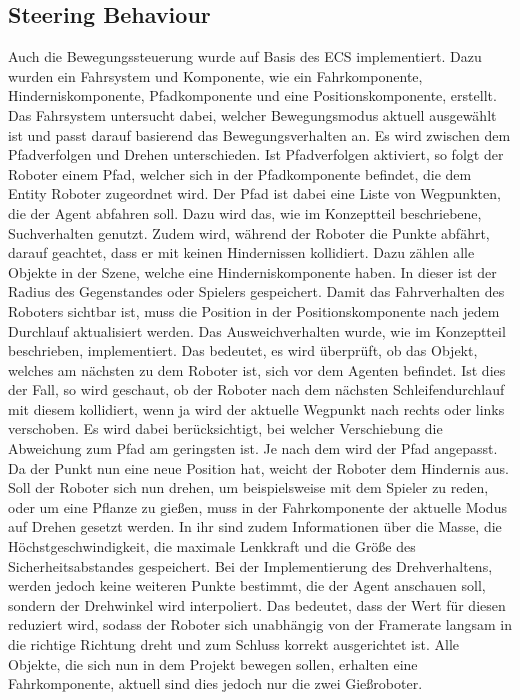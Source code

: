 \subsection{Steering Behaviour}
Auch die Bewegungssteuerung wurde auf Basis des ECS implementiert. Dazu wurden ein Fahrsystem und Komponente, wie ein Fahrkomponente, Hinderniskomponente, Pfadkomponente und eine Positionskomponente, erstellt. Das Fahrsystem untersucht dabei, welcher Bewegungsmodus aktuell ausgewählt ist und passt darauf basierend das Bewegungsverhalten an. Es wird zwischen dem Pfadverfolgen und Drehen unterschieden. Ist Pfadverfolgen aktiviert, so folgt der Roboter einem Pfad, welcher sich in der Pfadkomponente befindet, die dem Entity Roboter zugeordnet wird. Der Pfad ist dabei eine Liste von Wegpunkten, die der Agent abfahren soll. Dazu wird das, wie im Konzeptteil beschriebene, Suchverhalten genutzt. Zudem wird, während der Roboter die Punkte abfährt, darauf geachtet, dass er mit keinen Hindernissen kollidiert. Dazu zählen alle Objekte in der Szene, welche eine Hinderniskomponente haben. In dieser ist der Radius des Gegenstandes oder Spielers gespeichert. Damit das Fahrverhalten des Roboters sichtbar ist, muss die Position in der Positionskomponente nach jedem Durchlauf aktualisiert werden. Das Ausweichverhalten wurde, wie im Konzeptteil beschrieben, implementiert. Das bedeutet, es wird überprüft, ob das Objekt, welches am nächsten zu dem Roboter ist, sich vor dem Agenten befindet. Ist dies der Fall, so wird geschaut, ob der Roboter nach dem nächsten Schleifendurchlauf mit diesem kollidiert, wenn ja wird der aktuelle Wegpunkt nach rechts oder links verschoben. Es wird dabei berücksichtigt, bei welcher Verschiebung die Abweichung zum Pfad am geringsten ist. Je nach dem wird der Pfad angepasst. Da der Punkt nun eine neue Position hat, weicht der Roboter dem Hindernis aus.
Soll der Roboter sich nun drehen, um beispielsweise mit dem Spieler zu reden, oder um eine Pflanze zu gießen, muss in der Fahrkomponente der aktuelle Modus auf Drehen gesetzt werden. In ihr sind zudem Informationen über die Masse, die Höchstgeschwindigkeit, die maximale Lenkkraft und die Größe des Sicherheitsabstandes gespeichert. Bei der Implementierung des Drehverhaltens, werden jedoch keine weiteren Punkte bestimmt, die der Agent anschauen soll, sondern der Drehwinkel wird interpoliert. Das bedeutet, dass der Wert für diesen reduziert wird, sodass der Roboter sich unabhängig von der Framerate langsam in die richtige Richtung dreht und zum Schluss korrekt ausgerichtet ist. Alle Objekte, die sich nun in dem Projekt bewegen sollen, erhalten eine Fahrkomponente, aktuell sind dies jedoch nur die zwei Gießroboter. 
